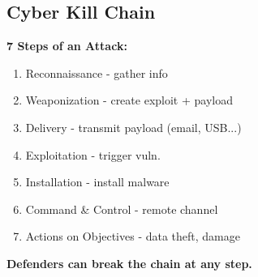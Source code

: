 \subsection{Cyber Kill Chain}
{
\textbf{7 Steps of an Attack:}
\begin{enumerate}[noitemsep]
  \item Reconnaissance - gather info
  \item Weaponization - create exploit + payload
  \item Delivery - transmit payload (email, USB...)
  \item Exploitation - trigger vuln.
  \item Installation - install malware
  \item Command \& Control - remote channel
  \item Actions on Objectives - data theft, damage
\end{enumerate}

\textbf{Defenders can break the chain at any step.}
}
